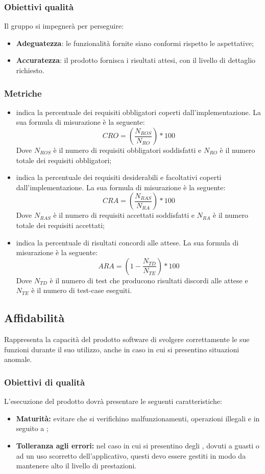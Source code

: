 \documentclass[PianoDiQualifica.tex]{subfiles}
\begin{document}
\subsubsection{Obiettivi qualità}
Il gruppo \gruppo si impegnerà per perseguire:
\begin{itemize}
	\item \textbf{Adeguatezza}: le funzionalità fornite siano conformi rispetto le aspettative;
	\item \textbf{Accuratezza}: il prodotto fornisca i risultati attesi, con il livello di dettaglio richiesto. 
\end{itemize}	
\subsubsection{Metriche}
\begin{itemize}
	\item {} indica la percentuale dei requisiti obbligatori coperti dall'implementazione. La sua formula di misurazione è la seguente: \[CRO=(\frac{N_{ROS}}{N_{RO}})*100\] Dove $ N_{ROS} $ è il numero di requisiti obbligatori soddisfatti e $ N_{RO} $ è il numero totale dei requisiti obbligatori;
	\item {} indica la percentuale dei requisiti desiderabili e facoltativi coperti dall'implementazione. La sua formula di misurazione è la seguente: \[CRA=(\frac{N_{RAS}}{N_{RA}})*100\] Dove $ N_{RAS} $ è il numero di requisiti accettati soddisfatti e $ N_{RA } $ è il numero totale dei requisiti accettati;
	\item {} indica la percentuale di risultati concordi alle attese. La sua formula di misurazione è la seguente: \[ARA=(1-\frac{N_{TD}}{N_{TE}})*100\] Dove $ N_{TD} $ è il numero di test che producono risultati discordi alle attese e $ N_{TE} $ è il numero di test-case eseguiti.
\end{itemize}
		
\subsection{Affidabilità}
Rappresenta la capacità del prodotto software di svolgere correttamente le sue funzioni durante il suo utilizzo, anche in caso in cui si presentino situazioni anomale.
\subsubsection{Obiettivi di qualità}
L'esecuzione del prodotto dovrà presentare le seguenti caratteristiche:
\begin{itemize}
	\item \textbf{Maturità:} evitare che si verifichino malfunzionamenti, operazioni illegali e  in seguito a ;
	\item \textbf{Tolleranza agli errori:} nel caso in cui si presentino degli , dovuti a guasti o ad un uso scorretto dell'applicativo, questi devo essere gestiti in modo da mantenere alto il livello di prestazioni.
\end{itemize}
\end{document}
